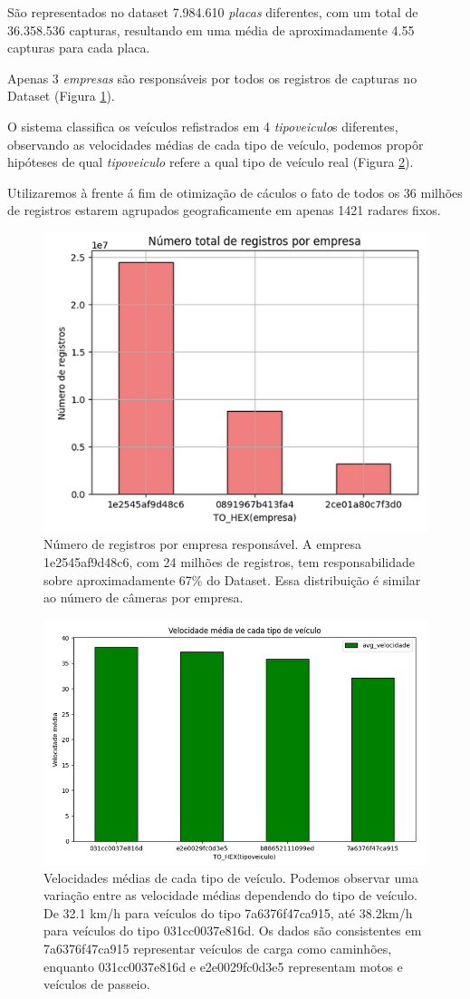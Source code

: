 \documentclass{article}
\begin{document}
São representados no dataset 7.984.610 \textit{placas} diferentes, com um total de 36.358.536 capturas, resultando em uma média de aproximadamente 4.55 capturas para cada placa.

Apenas 3 \textit{empresas} são responsáveis por todos os registros de capturas no Dataset (Figura  \ref{fig:registrosPorEmpresa}).

O sistema classifica os veículos refistrados em 4 \textit{tipoveiculo}s diferentes, observando as velocidades médias de cada tipo de veículo, podemos propôr hipóteses de qual \textit{tipoveiculo} refere a qual tipo de veículo real (Figura \ref{fig:tipoVeiculoAvgSpeed}).

Utilizaremos à frente á fim de otimização de cáculos o fato de todos os 36 milhões de registros estarem agrupados geograficamente em apenas 1421 radares fixos.

\begin{figure}
    \centering
    \includegraphics[width=0.5\linewidth]{registrosPorEmpresa.png}
    \caption{Número de registros por empresa responsável. A empresa 1e2545af9d48c6, com 24 milhões de registros, tem responsabilidade sobre aproximadamente 67\% do Dataset. Essa distribuição é similar ao número de câmeras por empresa.}
    \label{fig:registrosPorEmpresa}
\end{figure}

\begin{figure}
    \centering
    \includegraphics[width=0.75\linewidth]{tipoVeiculoAvgSpeed3.png}
    \caption{Velocidades médias de cada tipo de veículo. Podemos observar uma variação entre as velocidade médias dependendo do tipo de veículo. De 32.1 km/h para veículos do tipo 7a6376f47ca915, até 38.2km/h para veículos do tipo 031cc0037e816d. Os dados são consistentes em 7a6376f47ca915 representar veículos de carga como caminhões, enquanto 031cc0037e816d e e2e0029fc0d3e5 representam motos e veículos de passeio. }
    \label{fig:tipoVeiculoAvgSpeed}
\end{figure}
\end{document}
